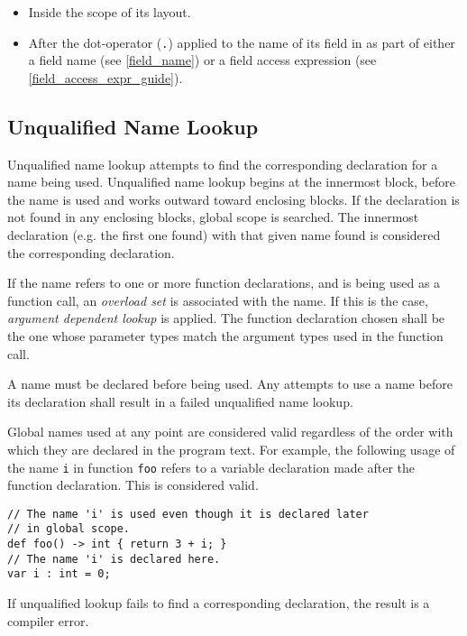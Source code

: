 \begin{itemize}
\item Inside the scope of its layout.
\item After the dot-operator (\texttt{.}) applied to the name of its field in as part of either a field name (see \ref{field_name}) or a field access expression (see \ref{field_access_expr_guide}).
\end{itemize}

\subsection{Unqualified Name Lookup} \label{unqlfd_lookup}

Unqualified name lookup attempts to find the corresponding declaration for a name being used. Unqualified name lookup begins at the innermost block, before the name is used and works outward toward enclosing blocks. If the declaration is not found in any enclosing blocks, global scope is searched. The innermost declaration (e.g. the first one found) with that given name found is considered the corresponding declaration.

If the name refers to one or more function declarations, and is being used as a function call, an \textit{overload set} is associated with the name. If this is the case, \textit{argument dependent lookup} is applied. The function declaration chosen shall be the one whose parameter types match the argument types used in the function call.

A name must be declared before being used. Any attempts to use a name before its declaration shall result in a failed unqualified name lookup.

Global names used at any point are considered valid regardless of the order with which they are declared in the program text. For example, the following usage of the name \texttt{i} in function \texttt{foo} refers to a variable declaration made after the function declaration. This is considered valid.

\begin{minip}
\begin{lstlisting}
// The name 'i' is used even though it is declared later
// in global scope.
def foo() -> int { return 3 + i; }
// The name 'i' is declared here.
var i : int = 0;
\end{lstlisting}
\end{minip}

If unqualified lookup fails to find a corresponding declaration, the result is a compiler error.

